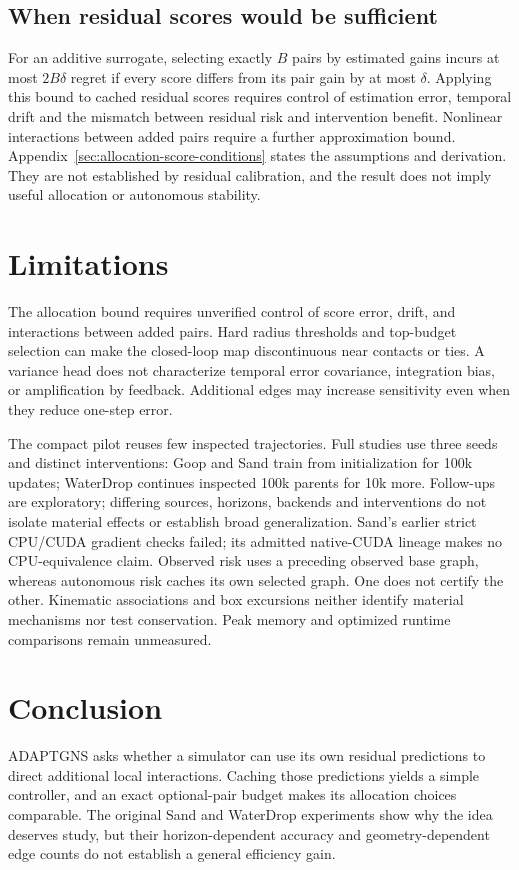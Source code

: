\subsection{When residual scores would be sufficient}
For an additive surrogate, selecting exactly $B$ pairs by estimated gains incurs at most $2B\delta$ regret if every score differs from its pair gain by at most $\delta$. Applying this bound to cached residual scores requires control of estimation error, temporal drift and the mismatch between residual risk and intervention benefit. Nonlinear interactions between added pairs require a further approximation bound. Appendix~\ref{sec:allocation-score-conditions} states the assumptions and derivation. They are not established by residual calibration, and the result does not imply useful allocation or autonomous stability.


\section{Limitations}
The allocation bound requires unverified control of score error, drift, and interactions between added pairs. Hard radius thresholds and top-budget selection can make the closed-loop map discontinuous near contacts or ties. A variance head does not characterize temporal error covariance, integration bias, or amplification by feedback. Additional edges may increase sensitivity even when they reduce one-step error.

The compact pilot reuses few inspected trajectories. Full studies use three seeds and distinct interventions: Goop and Sand train from initialization for 100k updates; WaterDrop continues inspected 100k parents for 10k more. Follow-ups are exploratory; differing sources, horizons, backends and interventions do not isolate material effects or establish broad generalization. Sand's earlier strict CPU/CUDA gradient checks failed; its admitted native-CUDA lineage makes no CPU-equivalence claim. Observed risk uses a preceding observed base graph, whereas autonomous risk caches its own selected graph. One does not certify the other. Kinematic associations and box excursions neither identify material mechanisms nor test conservation. Peak memory and optimized runtime comparisons remain unmeasured.

\section{Conclusion}
ADAPTGNS asks whether a simulator can use its own residual predictions to direct additional local interactions. Caching those predictions yields a simple controller, and an exact optional-pair budget makes its allocation choices comparable. The original Sand and WaterDrop experiments show why the idea deserves study, but their horizon-dependent accuracy and geometry-dependent edge counts do not establish a general efficiency gain.

